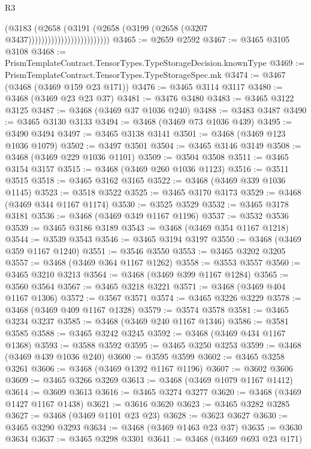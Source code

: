 \begin{lexlean}{R3}
\begin{coremodule}
                                        (@3183
                                          (@2658
                                            (@3191
                                              (@2658
                                                (@3199 (@2658 (@3207 @3437)))))))))))))))))))))))))
@3465 := @2659 @2592
@3467 := @3465 @3105 @3108
@3468 := PrismTemplateContract.TensorTypes.TypeStorageDecision.knownType
@3469 := PrismTemplateContract.TensorTypes.TypeStorageSpec.mk
@3474 := @3467 (@3468 (@3469 @159 @23 @171))
@3476 := @3465 @3114 @3117
@3480 := @3468 (@3469 @23 @23 @37)
@3481 := @3476 @3480
@3483 := @3465 @3122 @3125
@3487 := @3468 (@3469 @37 @1036 @240)
@3488 := @3483 @3487
@3490 := @3465 @3130 @3133
@3494 := @3468 (@3469 @73 @1036 @439)
@3495 := @3490 @3494
@3497 := @3465 @3138 @3141
@3501 := @3468 (@3469 @123 @1036 @1079)
@3502 := @3497 @3501
@3504 := @3465 @3146 @3149
@3508 := @3468 (@3469 @229 @1036 @1101)
@3509 := @3504 @3508
@3511 := @3465 @3154 @3157
@3515 := @3468 (@3469 @260 @1036 @1123)
@3516 := @3511 @3515
@3518 := @3465 @3162 @3165
@3522 := @3468 (@3469 @339 @1036 @1145)
@3523 := @3518 @3522
@3525 := @3465 @3170 @3173
@3529 := @3468 (@3469 @344 @1167 @1174)
@3530 := @3525 @3529
@3532 := @3465 @3178 @3181
@3536 := @3468 (@3469 @349 @1167 @1196)
@3537 := @3532 @3536
@3539 := @3465 @3186 @3189
@3543 := @3468 (@3469 @354 @1167 @1218)
@3544 := @3539 @3543
@3546 := @3465 @3194 @3197
@3550 := @3468 (@3469 @359 @1167 @1240)
@3551 := @3546 @3550
@3553 := @3465 @3202 @3205
@3557 := @3468 (@3469 @364 @1167 @1262)
@3558 := @3553 @3557
@3560 := @3465 @3210 @3213
@3564 := @3468 (@3469 @399 @1167 @1284)
@3565 := @3560 @3564
@3567 := @3465 @3218 @3221
@3571 := @3468 (@3469 @404 @1167 @1306)
@3572 := @3567 @3571
@3574 := @3465 @3226 @3229
@3578 := @3468 (@3469 @409 @1167 @1328)
@3579 := @3574 @3578
@3581 := @3465 @3234 @3237
@3585 := @3468 (@3469 @240 @1167 @1346)
@3586 := @3581 @3585
@3588 := @3465 @3242 @3245
@3592 := @3468 (@3469 @434 @1167 @1368)
@3593 := @3588 @3592
@3595 := @3465 @3250 @3253
@3599 := @3468 (@3469 @439 @1036 @240)
@3600 := @3595 @3599
@3602 := @3465 @3258 @3261
@3606 := @3468 (@3469 @1392 @1167 @1196)
@3607 := @3602 @3606
@3609 := @3465 @3266 @3269
@3613 := @3468 (@3469 @1079 @1167 @1412)
@3614 := @3609 @3613
@3616 := @3465 @3274 @3277
@3620 := @3468 (@3469 @1427 @1167 @1438)
@3621 := @3616 @3620
@3623 := @3465 @3282 @3285
@3627 := @3468 (@3469 @1101 @23 @23)
@3628 := @3623 @3627
@3630 := @3465 @3290 @3293
@3634 := @3468 (@3469 @1463 @23 @37)
@3635 := @3630 @3634
@3637 := @3465 @3298 @3301
@3641 := @3468 (@3469 @693 @23 @171)

\end{coremodule}
\end{lexlean}
